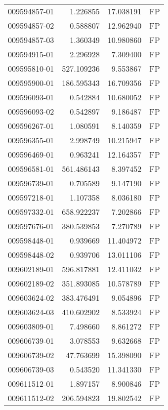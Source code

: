 \begin{tabular}{lrrl}
009594857-01 &    1.226855 &      17.038191 &   FP \\
009594857-02 &    0.588807 &      12.962940 &   FP \\
009594857-03 &    1.360349 &      10.980860 &   FP \\
009594915-01 &    2.296928 &       7.309400 &   FP \\
009595810-01 &  527.109236 &       9.553867 &   FP \\
009595900-01 &  186.595343 &      16.709356 &   FP \\
009596093-01 &    0.542884 &      10.680052 &   FP \\
009596093-02 &    0.542897 &       9.186487 &   FP \\
009596267-01 &    1.080591 &       8.140359 &   FP \\
009596355-01 &    2.998749 &      10.215947 &   FP \\
009596469-01 &    0.963241 &      12.164357 &   FP \\
009596581-01 &  561.486143 &       8.397452 &   FP \\
009596739-01 &    0.705589 &       9.147190 &   FP \\
009597218-01 &    1.107358 &       8.036180 &   FP \\
009597332-01 &  658.922237 &       7.202866 &   FP \\
009597676-01 &  380.539853 &       7.270789 &   FP \\
009598448-01 &    0.939669 &      11.404972 &   FP \\
009598448-02 &    0.939706 &      13.011106 &   FP \\
009602189-01 &  596.817881 &      12.411032 &   FP \\
009602189-02 &  351.893085 &      10.578789 &   FP \\
009603624-02 &  383.476491 &       9.054896 &   FP \\
009603624-03 &  410.602902 &       8.533924 &   FP \\
009603809-01 &    7.498660 &       8.861272 &   FP \\
009606739-01 &    3.078553 &       9.632668 &   FP \\
009606739-02 &   47.763699 &      15.398090 &   FP \\
009606739-03 &    0.543520 &      11.341330 &   FP \\
009611512-01 &    1.897157 &       8.900846 &   FP \\
009611512-02 &  206.594823 &      19.802542 &   FP \\

\end{tabular}
